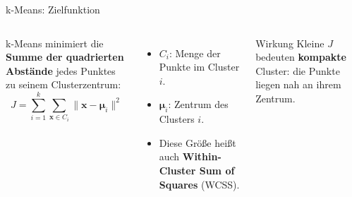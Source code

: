 \begin{frame}{k-Means: Zielfunktion}
\begin{columns}
k-Means minimiert die \textbf{Summe der quadrierten Abstände} jedes Punktes
zu seinem Clusterzentrum:
\[
  J = \sum_{i=1}^{k} \sum_{\mathbf{x} \in C_i}
      \lVert \mathbf{x} - \boldsymbol{\mu}_i \rVert^2
\]

\begin{itemize}
  \item $C_i$: Menge der Punkte im Cluster $i$.
  \item $\boldsymbol{\mu}_i$: Zentrum des Clusters $i$.
  \item Diese Größe heißt auch \textbf{Within-Cluster Sum of Squares}
        (WCSS).
\end{itemize}

\begin{blockC2}{Wirkung}
Kleine $J$ bedeuten \textbf{kompakte} Cluster: die Punkte liegen nah an
ihrem Zentrum.
\end{blockC2}
\end{columns}
\end{frame}


